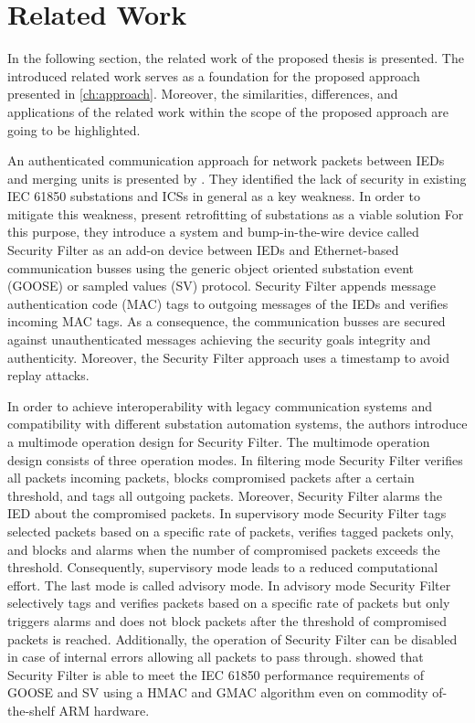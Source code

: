 \chapter{Related Work}
\label{ch:relatedwork}
In the following section, the related work of the proposed thesis is presented.
The introduced related work serves as a foundation for the proposed approach presented in \autoref{ch:approach}.
Moreover, the similarities, differences, and applications of the related work within the scope of the proposed approach are going to be highlighted.

An authenticated communication approach for network packets between IEDs and merging units is presented by \citeauthor{Ishchenko2018} \cite{Ishchenko2018}.
They identified the lack of security in existing IEC 61850 substations and ICSs in general as a key weakness.
In order to mitigate this weakness, \citeauthor{Ishchenko2018} present retrofitting of substations as a viable solution
For this purpose, they introduce a system and bump-in-the-wire device called Security Filter as an add-on device between IEDs and Ethernet-based communication busses using the generic object oriented substation event (GOOSE) or sampled values (SV) protocol.
Security Filter appends message authentication code (MAC) tags to outgoing messages of the IEDs and verifies incoming MAC tags.
As a consequence, the communication busses are secured against unauthenticated messages achieving the security goals integrity and authenticity.
Moreover, the Security Filter approach uses a timestamp to avoid replay attacks.

In order to achieve interoperability with legacy communication systems and compatibility with different substation automation systems, the authors introduce a multimode operation design for Security Filter.
The multimode operation design consists of three operation modes.
In filtering mode Security Filter verifies all packets incoming packets, blocks compromised packets after a certain threshold, and tags all outgoing packets.
Moreover, Security Filter alarms the IED about the compromised packets.
In supervisory mode Security Filter tags selected packets based on a specific rate of packets, verifies tagged packets only, and blocks and alarms when the number of compromised packets exceeds the threshold.
Consequently, supervisory mode leads to a reduced computational effort.
The last mode is called advisory mode.
In advisory mode Security Filter selectively tags and verifies packets based on a specific rate of packets but only triggers alarms and does not block packets after the threshold of compromised packets is reached.
Additionally, the operation of Security Filter can be disabled in case of internal errors allowing all packets to pass through.
\citeauthor{Ishchenko2018} showed that Security Filter is able to meet the IEC 61850 performance requirements of GOOSE and SV using a HMAC and GMAC algorithm even on commodity of-the-shelf ARM hardware.


